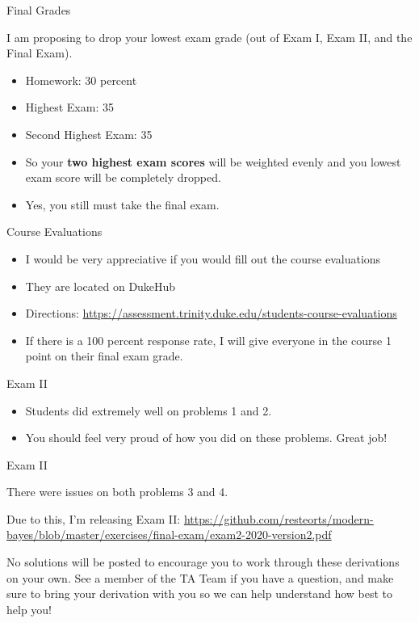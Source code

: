 \documentclass[
  ignorenonframetext,
]{beamer}
\providecommand{\tightlist}{%
  \setlength{\itemsep}{0pt}\setlength{\parskip}{0pt}}
\begin{document}
\begin{frame}{Final Grades}
\protect\hypertarget{final-grades}{}

I am proposing to drop your lowest exam grade (out of Exam I, Exam II,
and the Final Exam).

\begin{itemize}
\item
  Homework: 30 percent
\item
  Highest Exam: 35
\item
  Second Highest Exam: 35
\item
  So your \textbf{two highest exam scores} will be weighted evenly and
  you lowest exam score will be completely dropped.
\item
  Yes, you still must take the final exam.
\end{itemize}

\end{frame}

\begin{frame}{Course Evaluations}
\protect\hypertarget{course-evaluations}{}

\begin{itemize}
\tightlist
\item
  I would be very appreciative if you would fill out the course
  evaluations
\item
  They are located on DukeHub
\item
  Directions:
  \url{https://assessment.trinity.duke.edu/students-course-evaluations}
\item
  If there is a 100 percent response rate, I will give everyone in the
  course 1 point on their final exam grade.
\end{itemize}

\end{frame}

\begin{frame}{Exam II}
\protect\hypertarget{exam-ii}{}

\begin{itemize}
\tightlist
\item
  Students did extremely well on problems 1 and 2.
\item
  You should feel very proud of how you did on these problems. Great
  job!
\end{itemize}

\end{frame}

\begin{frame}{Exam II}
\protect\hypertarget{exam-ii-1}{}

There were issues on both problems 3 and 4.

Due to this, I'm releasing Exam II:
\url{https://github.com/resteorts/modern-bayes/blob/master/exercises/final-exam/exam2-2020-version2.pdf}

No solutions will be posted to encourage you to work through these
derivations on your own. See a member of the TA Team if you have a
question, and make sure to bring your derivation with you so we can help
understand how best to help you!

\end{frame}
\end{document}
